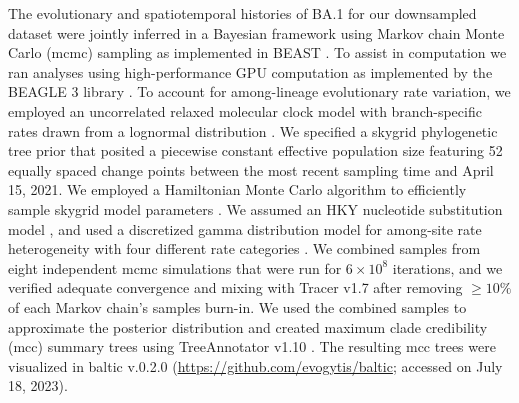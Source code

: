 The evolutionary and spatiotemporal histories of BA.1 for our downsampled dataset were jointly inferred in a Bayesian framework using Markov chain Monte Carlo (\gls{mcmc}) sampling as implemented in BEAST \citep{suchard2018bayesian}.
To assist in computation we ran analyses using high-performance GPU computation as implemented by the BEAGLE 3 library \citep{baele2019high,ayres2019beagle}.
To account for among-lineage evolutionary rate variation, we employed an uncorrelated relaxed molecular clock model with branch-specific rates drawn from a lognormal distribution \citep{drummond2006relaxed}.
We specified a skygrid phylogenetic tree prior \citep{gill2013improving} that posited a piecewise constant effective population size featuring 52 equally spaced change points between the most recent sampling time and April 15, 2021.
We employed a Hamiltonian Monte Carlo algorithm to efficiently sample skygrid model parameters \citep{baele2020hamiltonian}.
We assumed an HKY nucleotide substitution model \citep{hasegawa1985dating}, and used a discretized gamma distribution model for among-site rate heterogeneity with four different rate categories \citep{yang1994maximum}.
We combined samples from eight independent \gls{mcmc} simulations that were run for $6\times10^8$ iterations, and we verified adequate convergence and mixing with Tracer v1.7 \citep{rambaut2018posterior} after removing $\geq10\%$ of each Markov chain's samples burn-in.
We used the combined samples to approximate the posterior distribution and created maximum clade credibility (\gls{mcc}) summary trees using TreeAnnotator v1.10 \citep{suchard2018bayesian}.
The resulting \gls{mcc} trees were visualized in baltic v.0.2.0 (\url{https://github.com/evogytis/baltic}; accessed on July 18, 2023).


